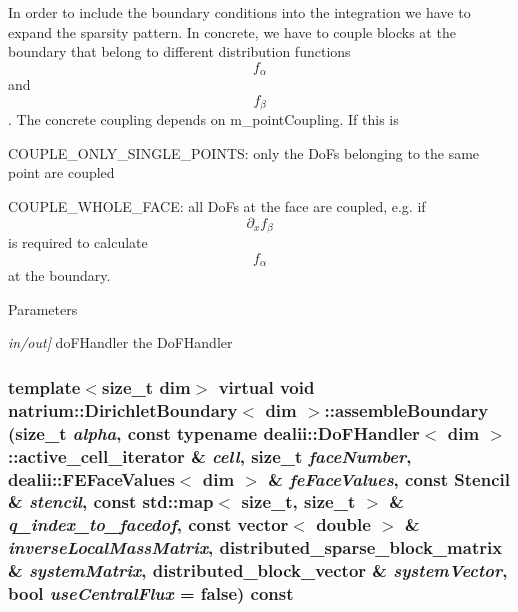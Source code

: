 In order to include the boundary conditions into the integration we have to expand the sparsity pattern. In concrete, we have to couple blocks at the boundary that belong to different distribution functions \[ f_{\alpha} \] and \[ f_{\beta} \]. The concrete coupling depends on m\_\-pointCoupling. If this is
\begin{DoxyItemize}
\item COUPLE\_\-ONLY\_\-SINGLE\_\-POINTS: only the DoFs belonging to the same point are coupled
\item COUPLE\_\-WHOLE\_\-FACE: all DoFs at the face are coupled, e.g. if \[ \partial_{x}f_{\beta} \] is required to calculate \[ f_{\alpha} \] at the boundary. 
\end{DoxyItemize}
\begin{DoxyParams}{Parameters}
\item[{\em in/out\mbox{]}}]doFHandler the DoFHandler \end{DoxyParams}
\hypertarget{classnatrium_1_1DirichletBoundary_a4f6ff88796031a747cab3db1be4ac603}{
\subsubsection[{assembleBoundary}]{\setlength{\rightskip}{0pt plus 5cm}template$<$size\_\-t dim$>$ virtual void {\bf natrium::DirichletBoundary}$<$ dim $>$::assembleBoundary (size\_\-t {\em alpha}, \/  const typename dealii::DoFHandler$<$ dim $>$::active\_\-cell\_\-iterator \& {\em cell}, \/  size\_\-t {\em faceNumber}, \/  dealii::FEFaceValues$<$ dim $>$ \& {\em feFaceValues}, \/  const {\bf Stencil} \& {\em stencil}, \/  const std::map$<$ size\_\-t, size\_\-t $>$ \& {\em q\_\-index\_\-to\_\-facedof}, \/  const vector$<$ double $>$ \& {\em inverseLocalMassMatrix}, \/  distributed\_\-sparse\_\-block\_\-matrix \& {\em systemMatrix}, \/  distributed\_\-block\_\-vector \& {\em systemVector}, \/  bool {\em useCentralFlux} = {\ttfamily false}) const}}
\label{classnatrium_1_1DirichletBoundary_a4f6ff88796031a747cab3db1be4ac603}



